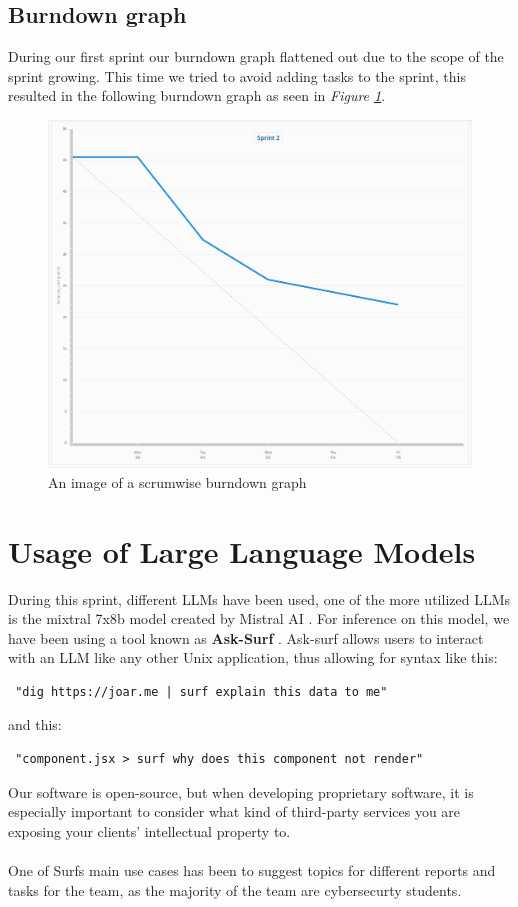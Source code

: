 \documentclass[12pt]{article}
\begin{document}
\subsection{Burndown graph}
During our first sprint our burndown graph flattened out due to the scope of the sprint growing. This time we tried to avoid adding tasks to the sprint, this resulted in the following burndown graph as seen in
\textit{Figure \ref{fig:BD}}.
\begin{figure}[h]
    \begin{adjustwidth}{-1in}{-1in}
        \centering
        \includegraphics[scale=0.4]{burndown.png}
        \caption{An image of a scrumwise burndown graph}
        \label{fig:BD}
    \end{adjustwidth}
\end{figure}
\clearpage

\section{Usage of Large Language Models}
During this sprint, different LLMs have been used, one of the more utilized LLMs is the mixtral 7x8b model created by Mistral AI 
\cite{aiMixtralExperts2023}. For inference on this model, we have been using a tool known as 
\textbf{Ask-Surf} \cite{heimonenSlenderman00AskSurf2024}. Ask-surf allows users to interact with an LLM 
like any other Unix application, thus allowing for syntax like this: \begin{verbatim} "dig https://joar.me | surf explain this data to me" \end{verbatim}
and this:
\begin{verbatim} "component.jsx > surf why does this component not render" \end{verbatim}
Our software is open-source, but when developing proprietary software, it is especially important to consider what kind of third-party services you are exposing your clients' intellectual property to.
\\
\\
One of Surfs main use cases has been to suggest topics for different reports and tasks for the team, as the majority of the team
are cybersecurty students.
\end{document}
